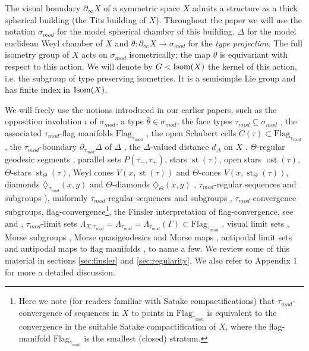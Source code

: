 \documentclass[12pt]{article}
\theoremstyle{boldplain}
\theoremstyle{bolddefinition}
\numberwithin{equation}{section}
\def\Ga{\Gamma}
\def\De{\Delta}
\def\La{\Lambda}
\def\si{\sigma}
\def\diamot{\diamondsuit_{\tau_{mod}}}
\def\diamoTh{\diamondsuit_{\Theta}}
\def\Dt{\partial_{\tau_{mod}}}
\def\Flagt{\operatorname{Flag_{\tau_{mod}}}}
\def\geo{\partial_{\infty}}
\def\Isom{\mathop{\hbox{Isom}}}
\def\Lat{\La_{\tau_{mod}}}
\def\LaXt{\Lambda_{X,\tau_{mod}}}
\def\simod{\si_{mod}}
\def\st{\operatorname{st}}
\def\ost{\operatorname{ost}}
\def\taumod{\tau_{mod}}
\begin{document}
The visual boundary $\geo X$ of a symmetric space $X$ admits a structure as a 
thick spherical building (the Tits building of $X$). Throughout the paper we will use the notation $\simod$ for the model spherical chamber of this building, 
$\De$ for the model euclidean Weyl chamber of $X$ and $\theta: \geo X\to \simod$ for the {\em type projection}.
The full isometry group of $X$ acts on $\simod$ isometrically; 
the map $\theta$ is equivariant with respect to this action. 
We will denote by $G< \Isom(X)$ the kernel of this action,
i.e. the subgroup of type preserving isometries.
It is a semisimple Lie group and has finite index in $\Isom(X)$.

We will freely use the notions introduced in our earlier papers,
such as 
the opposition involution $\iota$ of $\simod$, 
a type $\bar\theta\in\simod$, 
the face types $\taumod\subseteq\simod$ \cite[\S 2.2.2]{anolec}, 
the associated $\taumod$-flag manifolds $\Flagt$ \cite[\S 2.2.2, 2.2.3]{anolec},
the open Schubert cells $C(\tau)\subset \Flagt$ \cite[\S 2.4]{anolec}, 
the $\taumod$-boundary $\Dt\De$ of $\De$ \cite[\S 2.5.2]{anolec}, 
the $\Delta$-valued distance $d_\Delta$ on $X$ \cite[\S 2.6]{anolec}, 
$\Theta$-regular geodesic segments \cite[\S 2.5.3]{anolec}, 
parallel sets $P(\tau_-,\tau_+)$, stars $\st(\tau)$, open stars $\ost(\tau)$, $\Theta$-stars $\st_\Theta(\tau)$, 
Weyl cones $V(x, \st(\tau))$ and $\Theta$-cones $V(x, \st_\Theta(\tau))$, 
diamonds $\diamot(x,y)$ and $\Theta$-diamonds $\diamoTh(x,y)$ \cite[\S 2.5]{anolec}, 
$\taumod$-regular sequences and subgroups \cite[\S 4.2]{anolec}), 
uniformly $\taumod$-regular sequences and subgroups \cite[\S 4.6]{anolec}, 
$\taumod$-convergence subgroups, flag-convergence\footnote{ {Here we note (for readers familiar with Satake compactifications) that $\taumod$-convergence of sequences in $X$ to points in $\Flagt$ is equivalent to the convergence in the suitable Satake compactification of $X$, where the flag-manifold $\Flagt$ is the smallest (closed) stratum.}},  the Finsler interpretation of 
flag-convergence, see \cite[\S 4.5 and 5.2]{bordif} and \cite{anolec},
$\taumod$-limit sets $\LaXt=\Lat=\Lat(\Ga)\subset \Flagt$ \cite[\S 4.5]{anolec},
visual limit sets \cite[p.\ 4]{anolec}, 
Morse subgroups \cite[\S 5.4]{anolec}, Morse quasigeodesics and Morse maps \cite[Defs. 5.31, 5.33]{mlem}, 
antipodal limit sets \cite[Def. 5.1]{anolec} and antipodal maps to flag manifolds \cite[Def. 6.11]{mlem},
to name a few.
We review some of this material in sections \ref{sec:finsler} and \ref{sec:regularity}. We also refer to Appendix 1 for more a 
detailed discussion. 
\end{document}
